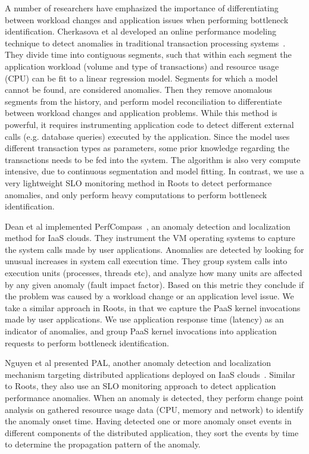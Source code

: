 A number of researchers have emphasized the importance of differentiating between workload changes and
application issues when performing bottleneck identification. Cherkasova et al developed an online
performance modeling technique to detect anomalies in traditional transaction processing systems~\cite{4630116}. 
They divide time into contiguous segments, such that within each
segment the application workload (volume and type of transactions) and resource usage (CPU) can be 
fit to a linear regression model.
Segments for which a model cannot be found, are considered anomalies. Then they remove anomalous segments
from the history, and perform model reconciliation to differentiate between workload changes and application problems. 
While this method is powerful, it
requires instrumenting application code to detect different external calls (e.g. database queries) executed by the application. 
Since the model uses different transaction types as parameters, 
some prior knowledge regarding the transactions needs to be fed into the system. 
The algorithm is also very compute intensive, due to continuous segmentation and model fitting.
In contrast, we use a very lightweight SLO monitoring method in Roots to detect performance anomalies, and
only perform heavy computations to perform bottleneck identification. 

Dean et al implemented PerfCompass~\cite{Dean:2014:PTR:2696535.2696551}, 
an anomaly detection and localization method for IaaS clouds. They instrument
the VM operating systems to capture the system calls made by user applications. Anomalies are detected by
looking for unusual increases in system call execution time. They group system calls into execution units
(processes, threads etc), and analyze how many units are affected by any given anomaly (fault impact factor). 
Based on this metric they conclude if the problem was caused by a workload change or an application
level issue. We take a similar approach in Roots, in that we capture the PaaS kernel invocations
made by user applications. We use application response time (latency) as an indicator of anomalies,
and group PaaS kernel invocations into application requests to perform bottleneck identification.

Nguyen et al presented PAL, another anomaly detection and localization mechanism targeting
distributed applications deployed on IaaS clouds~\cite{Nguyen:2011:PPR:2038633.2038634}. 
Similar to Roots, they also use an SLO monitoring approach to detect application
performance anomalies. When an anomaly is detected, they perform change point analysis
on gathered resource usage data (CPU, memory and network) to identify the anomaly onset time.
Having detected one or more anomaly onset events in different components of the
distributed application, they sort the events by time to determine
the propagation pattern of the anomaly.

